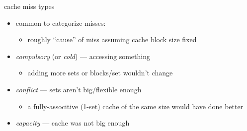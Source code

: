 \begin{frame}{cache miss types}
    \begin{itemize}
        \item common to categorize misses:
            \begin{itemize}
            \item roughly ``cause'' of miss assuming cache block size fixed
            \end{itemize}
        \vspace{.5cm}
        \item \textit{compulsory} (or \textit{cold}) ---  accessing something
            \begin{itemize}
            \item adding more sets or blocks/set wouldn't change
            \end{itemize}
        \item \textit{conflict} --- sets aren't big/flexible enough
            \begin{itemize}
            \item a fully-associtive (1-set) cache of the same size would have done better
            \end{itemize}
        \item \textit{capacity} --- cache was not big enough
    \end{itemize}
\end{frame}
